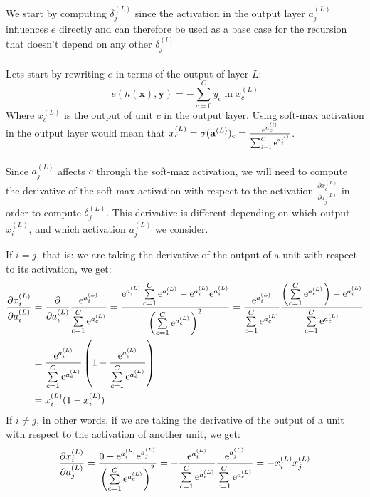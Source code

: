 We start by computing $\delta^{(L)}_j$ since the activation in the output layer $a^{(L)}_j$ influences $e$ directly and can therefore be used as a base case for the recursion that doesn't depend on any other $\delta^{(l)}_j$
\\\\
Lets start by rewriting $e$ in terms of the output of layer $L$:
$$
e(h(\mathbf{x}), \mathbf{y}) = - \sum\limits_{c=0}^C y_c \ln x^{(L)}_c
$$
Where $x^{(L)}_c$ is the output of unit $c$ in the output layer. Using soft-max activation in the output layer would mean that $x^{(L)}_c = \sigma(\mathbf{a}^{(L)})_c = \frac{\mathrm{e}^{a^{(l)}_c}}{\sum_{i=1}^C\mathrm{e}^{a^{(l)}_i}}$.
\\\\
Since $a^{(L)}_j$ affects $e$ through the soft-max activation, we will need to compute the derivative of the soft-max activation with respect to the activation $\frac{\partial x^{(L)}_i}{\partial a^{(L)}_j}$ in order to compute $\delta^{(L)}_j$. This derivative is different depending on which output $x^{(L)}_i$, and which activation $a^{(L)}_j$ we consider.

If $i = j$, that is: we are taking the derivative of the output of a unit with respect to its activation, we get:
\begin{align*}
	\frac{\partial x^{(L)}_i}{\partial a^{(L)}_i} &= \frac{\partial}{\partial a^{(L)}_i} \frac{\mathrm{e}^{a^{(L)}_i}}{\sum\limits_{c=1}^C \mathrm{e}^{a^{(L)}_c}}
	= \frac{\mathrm{e}^{a^{(L)}_i}\sum\limits_{c=1}^C \mathrm{e}^{a^{(L)}_c} - \mathrm{e}^{a^{(L)}_i}\mathrm{e}^{a^{(L)}_i}}{\left( \sum\limits_{c=1}^C \mathrm{e}^{a^{(L)}_c} \right)^2}
	= \frac{\mathrm{e}^{a^{(L)}_i}}{\sum\limits_{c=1}^C \mathrm{e}^{a^{(L)}_c}} \frac{\left( \sum\limits_{c=1}^C \mathrm{e}^{a^{(L)}_c} \right) - \mathrm{e}^{a^{(L)}_i}}{\sum\limits_{c=1}^C \mathrm{e}^{a^{(L)}_c}} \\
	&= \frac{\mathrm{e}^{a^{(L)}_i}}{\sum\limits_{c=1}^C \mathrm{e}^{a^{(L)}_c}} \left( 1 - \frac{\mathrm{e}^{a^{(L)}_i}}{\sum\limits_{c=1}^C \mathrm{e}^{a^{(L)}_c}} \right)\\
	&= x^{(L)}_i(1 - x^{(L)}_i)
\end{align*}
If $i \neq j$, in other words, if we are taking the derivative of the output of a unit with respect to the activation of another unit, we get:
\begin{align*}
	\frac{\partial x^{(L)}_i}{\partial a^{(L)}_j} = \frac{0 - \mathrm{e}^{a^{(L)}_i} \mathrm{e}^{a^{(L)}_j}}{\left( \sum\limits_{c=1}^C \mathrm{e}^{a^{(L)}_c} \right)^2} = - \frac{\mathrm{e}^{a^{(L)}_i}}{\sum\limits_{c=1}^C \mathrm{e}^{a^{(L)}_c}} \frac{\mathrm{e}^{a^{(L)}_j}}{\sum\limits_{c=1}^C \mathrm{e}^{a^{(L)}_c}} = - x^{(L)}_i x^{(L)}_j
\end{align*}

